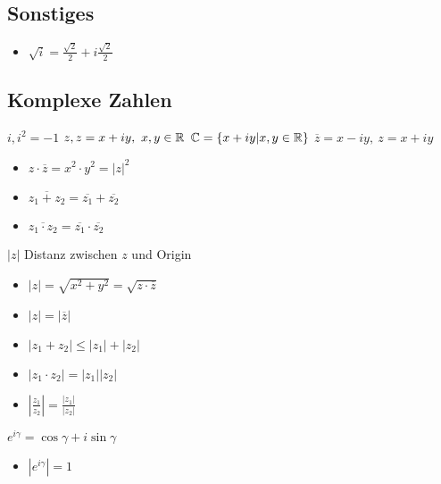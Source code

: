 \subsection{Sonstiges}
\begin{itemize}
     $x_{1 / 2} = \frac{-b \pm \sqrt{b^2 - 4ac}}{2a}$
    \item $\sqrt{i} = \frac{\sqrt{2}}{2} + i \frac{\sqrt{2}}{2}$
\end{itemize}

\subsection{Komplexe Zahlen}
\begin{itemize}
     $i, i^2 = -1$
     $z, z = x + iy, \ x, y \in \mathbb{R}$
     $\mathbb{C} = \{x + iy | x,y \in \mathbb{R}\}$
     $\overline{z} = x - iy, \ z = x + iy$
        \begin{itemize}
            \item $z \cdot \overline{z} = x^2 \cdot y^2 = |z|^2$
            \item $\overline{z_1 + z_2} = \overline{z_1} + \overline{z_2}$
            \item $\overline{z_1 \cdot z_2} = \overline{z_1} \cdot \overline{z_2}$
        \end{itemize}
     $|z|$ Distanz zwischen $z$ und Origin
        \begin{itemize}
            \item $|z| = \sqrt{x^2 + y^2} = \sqrt{z \cdot \overline{z}} $
            \item $|z| = |\overline{z}|$
            \item $|z_1 + z_2| \le |z_1| + |z_2|$
            \item $|z_1 \cdot z_2| = |z_1||z_2|$
            \item $|\frac{z_1}{z_2}| = \frac{|z_1|}{|z_2|}$
        \end{itemize}
     $e^{i\gamma} = \cos \gamma + i \sin \gamma$
        \begin{itemize}
            \item $|e^{i \gamma}| = 1$
        \end{itemize}
\end{itemize}


